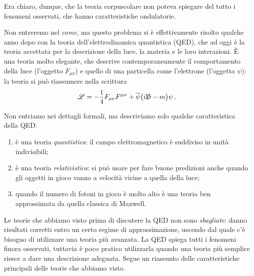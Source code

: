 \documentclass[a4paper,12pt]{article}
\newcommand{\DD}{\mathrm{D}}
\begin{document}
Era chiaro, dunque, che la teoria corpuscolare non poteva spiegare del tutto i fenomeni osservati, che hanno caratteristiche ondulatorie.

Non entreremo nel \emph{come}, ma questo problema si è effettivamente risolto qualche anno dopo con la teoria dell'elettrodinamica quantistica (QED), che ad oggi è la teoria accettata per la descrizione della luce, la materia e le loro interazioni. 
È una teoria molto elegante, che descrive contemporaneamente il comportamento della luce (l'oggetto \(F_{\mu \nu }\)) e quello di una particella come l'elettrone (l'oggetto \(\psi \)): la teoria si può riassumere nella scrittura
%
\begin{align}
\mathscr{L} = - \frac{1}{4}  F_{\mu \nu } F^{\mu \nu }
+ \overline{\psi} \qty(i \slashed{\DD} -m ) \psi 
\,.
\end{align}

Non entriamo nei dettagli formali, ma descriviamo solo qualche caratteristica della QED: 
\begin{enumerate}
    \item è una teoria \emph{quantistica}: il campo elettromagnetico è suddiviso in unità indivisibili;
    \item è una teoria \emph{relativistica}: si può usare per fare buone predizioni anche quando gli oggetti in gioco vanno a velocità vicine a quella della luce;
    \item quando il numero di fotoni in gioco è molto alto è una teoria ben approssimata da quella classica di Maxwell.
\end{enumerate}

Le teorie che abbiamo visto prima di discutere la QED non sono \emph{sbagliate}: danno risultati corretti entro un certo regime di approssimazione, uscendo dal quale c'è bisogno di utilizzare una teoria più avanzata.
La QED spiega tutti i fenomeni finora osservati, tuttavia è poco pratico utilizzarla quando una teoria più semplice riesce a dare una descrizione adeguata.
Segue un riassunto delle caratteristiche principali delle teorie che abbiamo visto.
\end{document}
